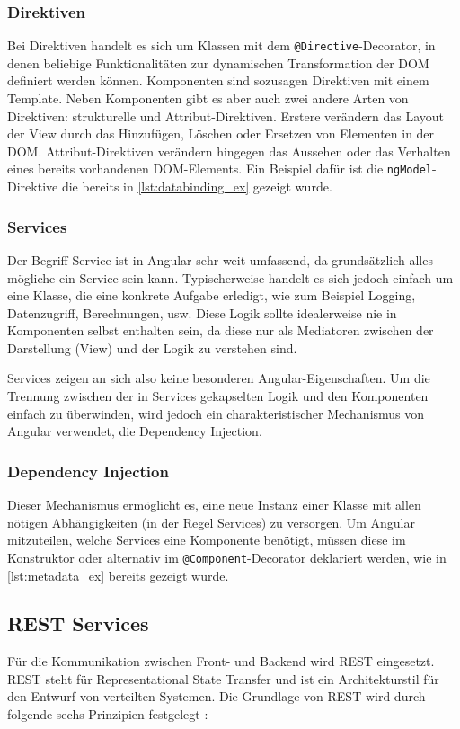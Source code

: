 \subsubsection{Direktiven}
Bei Direktiven handelt es sich um Klassen mit dem \texttt{@Directive}-Decorator, in denen beliebige Funktionalitäten zur dynamischen Transformation der DOM definiert werden können.
Komponenten sind sozusagen Direktiven mit einem Template. Neben Komponenten gibt es aber auch zwei andere Arten von Direktiven: strukturelle und Attribut-Direktiven.
Erstere verändern das Layout der View durch das Hinzufügen, Löschen oder Ersetzen von Elementen in der \acs{DOM}.
Attribut-Direktiven verändern hingegen das Aussehen oder das Verhalten eines bereits vorhandenen DOM-Elements.
Ein Beispiel dafür ist die \texttt{ngModel}-Direktive die bereits in \cref{lst:databinding_ex} gezeigt wurde.

\subsubsection{Services}
Der Begriff Service ist in Angular sehr weit umfassend, da grundsätzlich alles mögliche ein Service sein kann.
Typischerweise handelt es sich jedoch einfach um eine Klasse, die eine konkrete Aufgabe erledigt, wie zum Beispiel Logging, Datenzugriff, Berechnungen, usw.
Diese Logik sollte idealerweise nie in Komponenten selbst enthalten sein, da diese nur als Mediatoren zwischen der Darstellung (View) und der Logik zu verstehen sind.

Services zeigen an sich also keine besonderen Angular-Eigenschaften. Um die Trennung zwischen der in Services gekapselten Logik und den Komponenten einfach zu überwinden, wird jedoch ein charakteristischer Mechanismus von Angular verwendet, die Dependency Injection.

\subsubsection{Dependency Injection}
Dieser Mechanismus ermöglicht es, eine neue Instanz einer Klasse mit allen nötigen Abhängigkeiten (in der Regel Services) zu versorgen.
Um Angular mitzuteilen, welche Services eine Komponente benötigt, müssen diese im Konstruktor oder alternativ im \texttt{@Component}-Decorator deklariert werden, wie in \cref{lst:metadata_ex} bereits gezeigt wurde.

\subsection{REST Services}
Für die Kommunikation zwischen Front- und Backend wird REST eingesetzt. REST steht für Representational State Transfer und ist ein Architekturstil für den Entwurf von verteilten Systemen. Die Grundlage von REST wird durch folgende sechs Prinzipien festgelegt \cite{Varanasi2015}:

